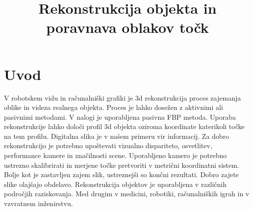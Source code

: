 \documentclass[journal,a4paper,twoside]{sty/IEEEtran}
\begin{document}
\title{Rekonstrukcija objekta in poravnava oblakov točk}


\address{Univerza v Ljubljani, Fakulteta za elektrotehniko, Tržaška 25, 1000 Ljubljana, Slovenija\\
E-pošta: janez.lapajne@gmail.com, knap.martin@gmail.com}






\maketitle



\section{Uvod}
V robotskem vidu in računalniški grafiki je 3d rekonstrukcija proces zajemanja oblike in videza realnega objekta. Proces je lahko dosežen z aktivnimi ali pasivnimi metodami. V nalogi je uporabljena pasivna FBP metoda. Uporaba rekonstrukcije lahko določi profil 3d objekta oziroma koordinate katerikoli točke na tem profilu. Digitalna slika je v našem primeru vir informacij. Za dobro rekonstrukcijo je potrebno upoštevati vizualno dispariteto, osvetlitev, performance kamere in značilnosti scene. Uporabljeno kamero je potrebno ustrezno skalibrirati in merjene točke pretvoriti v metrični koordinatni sistem. Bolje kot je zastavljen zajem slik, ustreznejši so končni rezultati. Dobro zajete slike olajšajo obdelavo. Rekonstrukcija objektov je uporabljena v različnih področjih raziskovanja. Med drugim v medicini, robotiki, računalniških igrah in v vzvratnem inženirstvu. 
\end{document}
